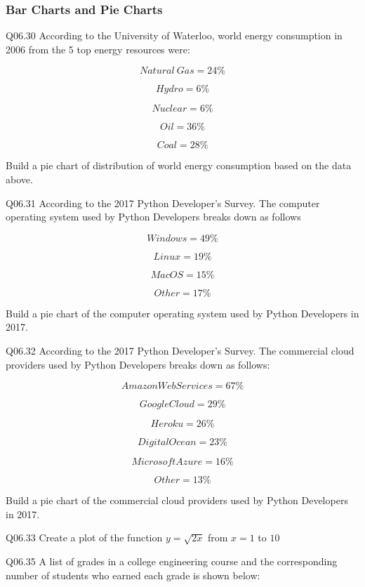 \documentclass{book}
\newenvironment{problems}{}{}  %
\begin{document}
    




    
        \subsubsection{Bar Charts and Pie
Charts}\label{bar-charts-and-pie-charts}
    




    
        \begin{problems}
        Q06.30 According to the University of Waterloo, world energy consumption
in 2006 from the 5 top energy resources were:

\[ Natural \ Gas = 24\% \]

\[ Hydro = 6\% \]

\[ Nuclear = 6\% \]

\[ Oil = 36\% \]

\[ Coal = 28\% \]

Build a pie chart of distribution of world energy consumption based on
the data above.

Q06.31 According to the 2017 Python Developer's Survey. The computer
operating system used by Python Developers breaks down as follows

\[ Windows = 49\% \]

\[ Linux = 19\% \]

\[ MacOS = 15\% \]

\[ Other = 17\% \]

Build a pie chart of the computer operating system used by Python
Developers in 2017.

Q06.32 According to the 2017 Python Developer's Survey. The commercial
cloud providers used by Python Developers breaks down as follows:

\[ Amazon Web Services = 67\% \]

\[ Google Cloud = 29\% \]

\[ Heroku = 26\% \]

\[ Digital Ocean = 23\% \]

\[ Microsoft Azure = 16\% \]

\[ Other = 13\% \]

Build a pie chart of the commercial cloud providers used by Python
Developers in 2017.

Q06.33 Create a plot of the function \(y=\sqrt{2x}\) from \(x = 1\) to
\(10\)

Q06.35 A list of grades in a college engineering course and the
corresponding number of students who earned each grade is shown below:


\end{problems}
\end{document}
